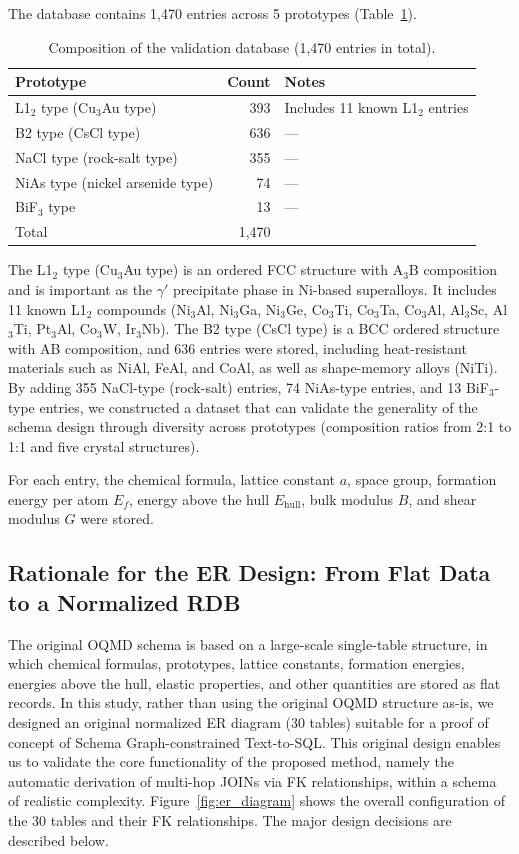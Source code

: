 \documentclass[5p,twocolumn]{elsarticle}
\begin{document}
The database contains 1{,}470 entries across 5 prototypes (Table~\ref{tab:db_composition}).

\begin{table}[htbp]
  \centering
  \caption{Composition of the validation database (1{,}470 entries in total).}
  \label{tab:db_composition}
  \small
  \begin{tabular}{lrl}
    \toprule
    Prototype & Count & Notes \\
    \midrule
    L1$_2$ type (Cu$_3$Au type) & 393 & Includes 11 known L1$_2$ entries \\
    B2 type (CsCl type) & 636 & --- \\
    NaCl type (rock-salt type) & 355 & --- \\
    NiAs type (nickel arsenide type) & 74 & --- \\
    BiF$_3$ type & 13 & --- \\
    \midrule
    Total & 1{,}470 & \\
    \bottomrule
  \end{tabular}
\end{table}

The L1$_2$ type (Cu$_3$Au type) is an ordered FCC structure with A$_3$B composition
and is important as the $\gamma'$ precipitate phase in Ni-based superalloys.
It includes 11 known L1$_2$ compounds (Ni$_3$Al, Ni$_3$Ga, Ni$_3$Ge, Co$_3$Ti, Co$_3$Ta, Co$_3$Al,
Al$_3$Sc, Al$_3$Ti, Pt$_3$Al, Co$_3$W, Ir$_3$Nb).
The B2 type (CsCl type) is a BCC ordered structure with AB composition,
and 636 entries were stored, including heat-resistant materials such as NiAl, FeAl, and CoAl,
as well as shape-memory alloys (NiTi).
By adding 355 NaCl-type (rock-salt) entries, 74 NiAs-type entries, and 13 BiF$_3$-type entries,
we constructed a dataset that can validate the generality of the schema design
through diversity across prototypes (composition ratios from 2:1 to 1:1 and five crystal structures).

For each entry, the chemical formula, lattice constant $a$, space group,
formation energy per atom $E_f$, energy above the hull $E_\text{hull}$,
bulk modulus $B$, and shear modulus $G$ were stored.

\subsection{Rationale for the ER Design: From Flat Data to a Normalized RDB}
\label{sec:er_design}

The original OQMD schema is based on a large-scale single-table structure,
in which chemical formulas, prototypes, lattice constants, formation energies,
energies above the hull, elastic properties, and other quantities are stored
as flat records.
In this study, rather than using the original OQMD structure as-is,
we designed an original normalized ER diagram (30 tables) suitable for
a proof of concept of Schema Graph-constrained Text-to-SQL.
This original design enables us to validate the core functionality of the proposed method,
namely the automatic derivation of multi-hop JOINs via FK relationships,
within a schema of realistic complexity.
Figure~\ref{fig:er_diagram} shows the overall configuration of the 30 tables and their FK relationships.
The major design decisions are described below.
\end{document}
